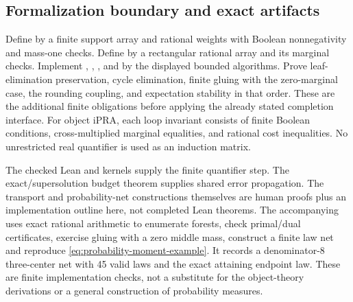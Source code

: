 \subsection{Formalization boundary and exact artifacts}

Define  by a finite support array and rational weights
with Boolean nonnegativity and mass-one checks.  Define
 by a rectangular rational array and its marginal
checks.  Implement , ,
, and  by the displayed bounded
algorithms.  Prove leaf-elimination preservation, cycle elimination,
finite gluing with the zero-marginal case, the rounding coupling, and
expectation stability in that order.  These are the additional finite
obligations before applying the already stated completion interface.
For object iPRA, each loop invariant consists of finite Boolean conditions,
cross-multiplied marginal equalities, and rational cost inequalities.
No unrestricted real quantifier is used as an induction matrix.

The checked Lean  and
 kernels supply the finite quantifier
step.  The exact/supersolution budget theorem supplies shared error
propagation.  The transport and probability-net constructions themselves
are human proofs plus an implementation outline here, not completed Lean
theorems.  The accompanying  uses exact
rational arithmetic to enumerate forests, check primal/dual certificates,
exercise gluing with a zero middle mass, construct a finite law net and
reproduce \eqref{eq:probability-moment-example}.  It records a denominator-8
three-center net with 45 valid laws and the exact attaining endpoint law.
These are finite implementation checks, not a substitute for the
object-theory derivations or a general construction of probability measures.

